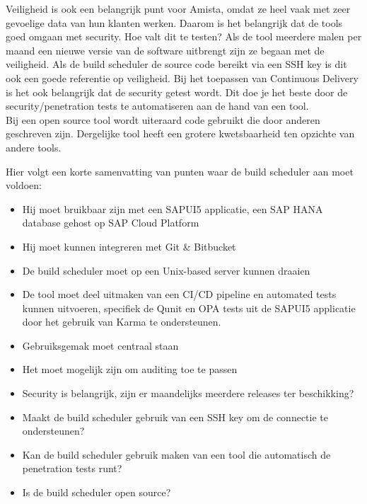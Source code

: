             Veiligheid is ook een belangrijk punt voor Amista, omdat ze heel vaak met zeer gevoelige data van hun klanten werken. Daarom is het belangrijk dat de tools goed omgaan met security. Hoe valt dit te testen? Als de tool meerdere malen per maand een nieuwe versie van de software uitbrengt zijn ze begaan met de veiligheid. Als de build scheduler de source code bereikt via een SSH key is dit ook een goede referentie op veiligheid. Bij het toepassen van Continuous Delivery is het ook belangrijk dat de security getest wordt. Dit doe je het beste door de security/penetration tests te automatiseren aan de hand van een tool.\\
            Bij een open source tool wordt uiteraard code gebruikt die door anderen geschreven zijn. Dergelijke tool heeft een grotere kwetsbaarheid ten opzichte van andere tools.
            
            Hier volgt een korte samenvatting van punten waar de build scheduler aan moet voldoen:
            \begin{itemize}
                \item Hij moet bruikbaar zijn met een SAPUI5 applicatie, een SAP HANA database gehost op SAP Cloud Platform
                \item Hij moet kunnen integreren met Git \& Bitbucket
                \item De build scheduler moet op een Unix-based server kunnen draaien
                \item De tool moet deel uitmaken van een CI/CD pipeline en automated tests kunnen uitvoeren, specifiek de Qunit en OPA tests uit de SAPUI5 applicatie door het gebruik van Karma te ondersteunen.
                \item Gebruiksgemak moet centraal staan
                \item Het moet mogelijk zijn om auditing toe te passen
                \item Security is belangrijk, zijn er maandelijks meerdere releases ter beschikking?
                \item Maakt de build scheduler gebruik van een SSH key om de connectie te ondersteunen?
                \item Kan de build scheduler gebruik maken van een tool die automatisch de penetration tests runt?
                \item Is de build scheduler open source?
            \end{itemize}
            
            
